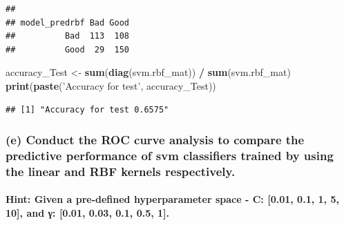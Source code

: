\documentclass[]{article}
\newenvironment{Shaded}{\begin{snugshade}}{\end{snugshade}}
\newcommand{\KeywordTok}[1]{\textcolor[rgb]{0.13,0.29,0.53}{\textbf{#1}}}
\newcommand{\NormalTok}[1]{#1}
\newcommand{\OperatorTok}[1]{\textcolor[rgb]{0.81,0.36,0.00}{\textbf{#1}}}
\newcommand{\StringTok}[1]{\textcolor[rgb]{0.31,0.60,0.02}{#1}}
\let\oldparagraph\paragraph
\renewcommand{\paragraph}[1]{\oldparagraph{#1}\mbox{}}
\begin{document}
\begin{Shaded}
\end{Shaded}

\begin{verbatim}
##              
## model_predrbf Bad Good
##          Bad  113  108
##          Good  29  150
\end{verbatim}

\begin{Shaded}
\begin{Highlighting}[]
\NormalTok{accuracy_Test <-}\StringTok{ }\KeywordTok{sum}\NormalTok{(}\KeywordTok{diag}\NormalTok{(svm.rbf_mat)) }\OperatorTok{/}\StringTok{ }\KeywordTok{sum}\NormalTok{(svm.rbf_mat)}
\KeywordTok{print}\NormalTok{(}\KeywordTok{paste}\NormalTok{(}\StringTok{'Accuracy for test'}\NormalTok{, accuracy_Test))}
\end{Highlighting}
\end{Shaded}

\begin{verbatim}
## [1] "Accuracy for test 0.6575"
\end{verbatim}

\hypertarget{e-conduct-the-roc-curve-analysis-to-compare-the-predictive-performance-of-svm-classifiers-trained-by-using-the-linear-and-rbf-kernels-respectively.}{%
\subsubsection{(e) Conduct the ROC curve analysis to compare the
predictive performance of svm classifiers trained by using the linear
and RBF kernels
respectively.}\label{e-conduct-the-roc-curve-analysis-to-compare-the-predictive-performance-of-svm-classifiers-trained-by-using-the-linear-and-rbf-kernels-respectively.}}

\hypertarget{hint-given-a-pre-defined-hyperparameter-space---c-0.01-0.1-1-5-10-and-ux3b3-0.01-0.03-0.1-0.5-1.}{%
\paragraph{Hint: Given a pre-defined hyperparameter space - C: {[}0.01,
0.1, 1, 5, 10{]}, and γ: {[}0.01, 0.03, 0.1, 0.5,
1{]}.}\label{hint-given-a-pre-defined-hyperparameter-space---c-0.01-0.1-1-5-10-and-ux3b3-0.01-0.03-0.1-0.5-1.}}
\end{document}
